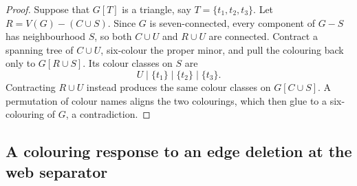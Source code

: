 \documentclass[11pt]{amsart}
\begin{document}
\begin{proof}
Suppose that $G[T]$ is a triangle, say $T=\{t_1,t_2,t_3\}$.  Let
$R=V(G)-(C\cup S)$.  Since $G$ is seven-connected, every component of
$G-S$ has neighbourhood $S$, so both $C\cup U$ and $R\cup U$ are connected.
Contract a spanning tree of $C\cup U$, six-colour the proper minor, and pull
the colouring back only to $G[R\cup S]$.  Its colour classes on $S$ are
\[
                         U\mid\{t_1\}\mid\{t_2\}
                           \mid\{t_3\}.                \tag{6.5}
\]
Contracting $R\cup U$ instead produces the same colour classes on
$G[C\cup S]$.  A permutation of colour names aligns the two colourings,
which then glue to a six-colouring of $G$, a contradiction.
\end{proof}

\subsection{A colouring response to an edge deletion at the web separator}
\end{document}
